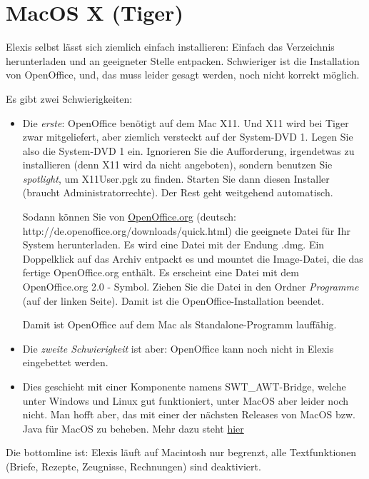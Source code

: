 \section{MacOS X (Tiger) }
Elexis selbst lässt sich ziemlich einfach installieren: Einfach das Verzeichnis herunterladen und an geeigneter Stelle entpacken. Schwieriger ist die Installation von OpenOffice, und, das muss leider gesagt werden, noch nicht korrekt möglich.

Es gibt zwei Schwierigkeiten:
\begin{itemize}
 \item

Die \textit{erste}: OpenOffice benötigt auf dem Mac X11. Und X11 wird bei Tiger zwar mitgeliefert, aber ziemlich versteckt auf der System-DVD 1. Legen Sie also die System-DVD 1 ein. Ignorieren Sie die Aufforderung, irgendetwas zu installieren (denn X11 wird da nicht angeboten), sondern benutzen Sie \textit{spotlight}, um X11User.pgk zu finden. Starten Sie dann diesen Installer (braucht Administratorrechte). Der Rest geht weitgehend automatisch.

Sodann können Sie von \href{http://www.openoffice.org}{OpenOffice.org} (deutsch: http://de.openoffice.org/downloads/quick.html) die geeignete Datei für Ihr System herunterladen. Es wird eine Datei mit der Endung .dmg. Ein Doppelklick auf das Archiv entpackt es und mountet die Image-Datei, die das fertige OpenOffice.org enthält. Es erscheint eine Datei mit dem OpenOffice.org 2.0 - Symbol. Ziehen Sie die Datei in den Ordner \textit{Programme} (auf der linken Seite). Damit ist die OpenOffice-Installation beendet.

Damit ist OpenOffice auf dem Mac als Standalone-Programm lauffähig.

\item Die \textit{zweite Schwierigkeit} ist aber: OpenOffice kann noch nicht in Elexis eingebettet werden.
\item  Dies geschieht mit einer Komponente namens SWT\_AWT-Bridge, welche unter
Windows und Linux gut funktioniert, unter MacOS aber leider noch nicht. Man hofft aber, das mit einer der nächsten Releases
von MacOS bzw. Java für MacOS zu beheben. Mehr dazu steht \href{https://bugs.eclipse.org/bugs/show_bug.cgi?id=67384}{hier}
\end{itemize}

Die bottomline ist: Elexis läuft auf Macintosh nur begrenzt, alle Textfunktionen (Briefe, Rezepte, Zeugnisse, Rechnungen) sind deaktiviert.

